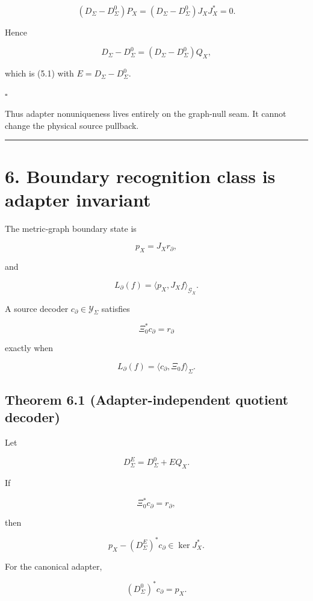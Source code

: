 \[
(D_\Sigma-D_\Sigma^0)P_X
=
(D_\Sigma-D_\Sigma^0)J_XJ_X^*
=
0.
\]

Hence

\[
D_\Sigma-D_\Sigma^0
=
(D_\Sigma-D_\Sigma^0)Q_X,
\]

which is (5.1) with \(E=D_\Sigma-D_\Sigma^0\).

\(\square\)

Thus adapter nonuniqueness lives entirely on the graph-null seam. It cannot
change the physical source pullback.

\begin{center}\rule{0.5\linewidth}{0.5pt}\end{center}

\hypertarget{boundary-recognition-class-is-adapter-invariant}{%
\section{6. Boundary recognition class is adapter invariant}\label{boundary-recognition-class-is-adapter-invariant}}

The metric-graph boundary state is

\[
p_X=J_Xr_\partial,
\]

and

\[
L_\partial(f)
=
\langle p_X,J_Xf\rangle_{\mathcal G_X}.
\]

A source decoder \(c_\partial\in\mathcal Y_\Sigma\) satisfies

\[
\Xi_0^*c_\partial=r_\partial
\]

exactly when

\[
L_\partial(f)
=
\langle c_\partial,\Xi_0f\rangle_\Sigma.
\]

\hypertarget{theorem-6.1-adapter-independent-quotient-decoder}{%
\subsection{Theorem 6.1 (Adapter-independent quotient decoder)}\label{theorem-6.1-adapter-independent-quotient-decoder}}

Let

\[
D_\Sigma^E=D_\Sigma^0+EQ_X.
\]

If

\[
\Xi_0^*c_\partial=r_\partial,
\]

then

\[
\boxed{
p_X-(D_\Sigma^E)^*c_\partial
\in\ker J_X^*.
}
\tag{6.1}
\]

For the canonical adapter,

\[
\boxed{
(D_\Sigma^0)^*c_\partial=p_X.
}
\tag{6.2}
\]

